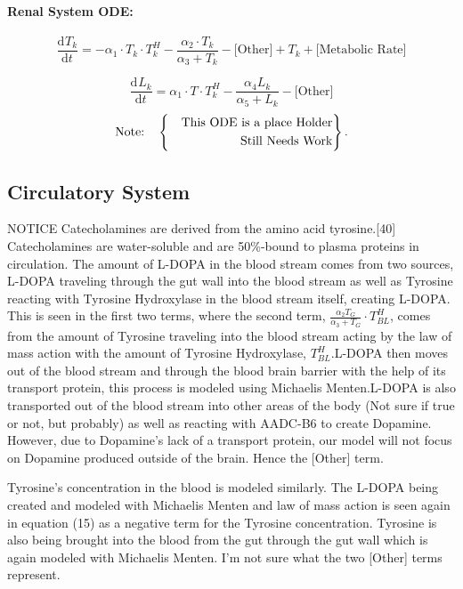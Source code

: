 \documentclass[smallextended]{svjour3}
\newcommand{\od}[3][]{\ensuremath{\frac{\mathrm{d}^{#1} {#2}}{\mathrm{d}{#3}^{#1}}}}
\newcommand{\Notice}[1]{{\huge\color{pink}NOTICE {#1}}}
\newcommand{\TwoNote}[4]{$$\text{Note:}\quad\left\{\begin{aligned} {#1} \text{\quad #2} \\
{#3} \text{\quad #4} \\ \end{aligned}\right\}.$$}
\begin{document}
\paragraph{Renal System ODE:}
\begin{equation}
\label{eq:12}
\od{T_k}{t}= -\alpha_1 \cdot T_k \cdot T_k^H - \frac{\alpha_2 \cdot T_k}{\alpha_3 + T_k} -\text{[Other]}+T_k +\text{[Metabolic Rate]}
\end{equation}

\begin{equation}
\label{eq:13}
\od{L_k}{t}=\alpha_1\cdot T \cdot T_k^H - \frac{\alpha_4 L_k}{\alpha_5 + L_k} - \text{[Other]}
\end{equation}
\TwoNote{}{\text{This ODE is a place Holder}}{}{\text{Still Needs Work}}
\subsection{Circulatory System}
\Notice{Catecholamines are derived from the amino acid tyrosine.[40] Catecholamines are water-soluble and are 50\%-bound to plasma proteins in circulation.}
The amount of L-DOPA in the blood stream comes from two sources, L-DOPA traveling through the gut wall into the blood stream as well as Tyrosine reacting with Tyrosine Hydroxylase in the blood stream itself, creating L-DOPA. This is seen in the first two terms, where the second term, $\frac{\alpha_2 T_G}{\alpha_3 + T_G} \cdot T_{BL}^H$, comes from the amount of Tyrosine traveling into the blood stream acting by the law of mass action with the amount of Tyrosine Hydroxylase, $T_{BL}^H$.L-DOPA then moves out of the blood stream and through the blood brain barrier with the help of its transport protein, this process is modeled using Michaelis Menten.L-DOPA is also transported out of the blood stream into other areas of the body (Not sure if true or not, but probably) as well as reacting with AADC-B6 to create Dopamine. However, due to Dopamine's lack of a transport protein, our model will not focus on Dopamine produced outside of the brain.\cite{Ref33} Hence the [Other] term.

Tyrosine's concentration in the blood is modeled similarly. The L-DOPA being created and modeled with Michaelis Menten and law of mass action is seen again in equation (15) as a negative term for the Tyrosine concentration. Tyrosine is also being brought into the blood from the gut through the gut wall which is again modeled with Michaelis Menten. I'm not sure what the two [Other] terms represent. 
\end{document}
